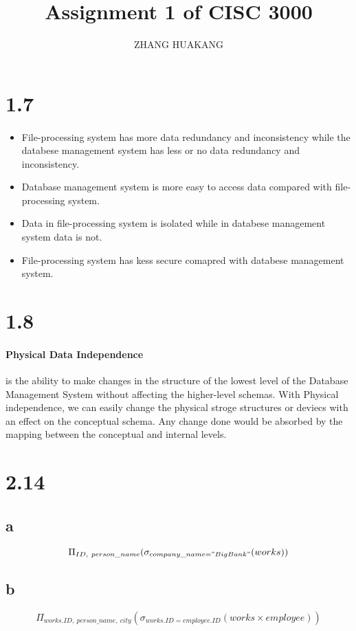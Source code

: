 \documentclass{article}
\title{Assignment 1 of CISC 3000}
\author{ZHANG HUAKANG}
\begin{document}
    \maketitle
    \section*{1.7}
    \paragraph{}
    \begin{itemize}
        \item File-processing system has more data redundancy and inconsistency while the databese management system has less or no data redundancy and inconsistency.
        \item Database management system is more easy to access data compared with file-processing system.
        \item Data in file-processing system is isolated while in databese management system data is not.
        \item File-processing system has kess secure comapred with databese management system.
    \end{itemize}
    \section*{1.8}
    \paragraph{Physical Data Independence}is the ability to make changes in the structure of the lowest level of the Database Management System without affecting the higher-level schemas. With Physical independence, we can easily change the physical stroge structures or deviecs with an effect on the conceptual schema. Any change done would be absorbed by the mapping between the conceptual and internal levels.
    \section*{2.14}
    \subsection*{a} $$\Pi_{ID,\ person\_name}(\sigma_{company\_name="BigBank"}(works))$$
    \subsection*{b} $$\Pi_{works.ID,\  person\_name, \ city}(\sigma_{works.ID=employee.ID}(works \times employee))$$
\end{document}
